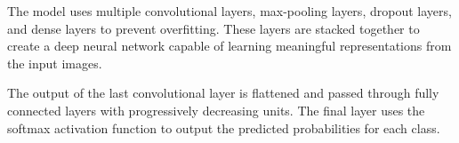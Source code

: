 \documentclass[11pt]{article}
\begin{document}


The model uses multiple convolutional layers, max-pooling layers, dropout layers, and dense layers to prevent overfitting. These layers are stacked together to create a deep neural network capable of learning meaningful representations from the input images.

The output of the last convolutional layer is flattened and passed through fully connected layers with progressively decreasing units. The final layer uses the softmax activation function to output the predicted probabilities for each class.
\end{document}

